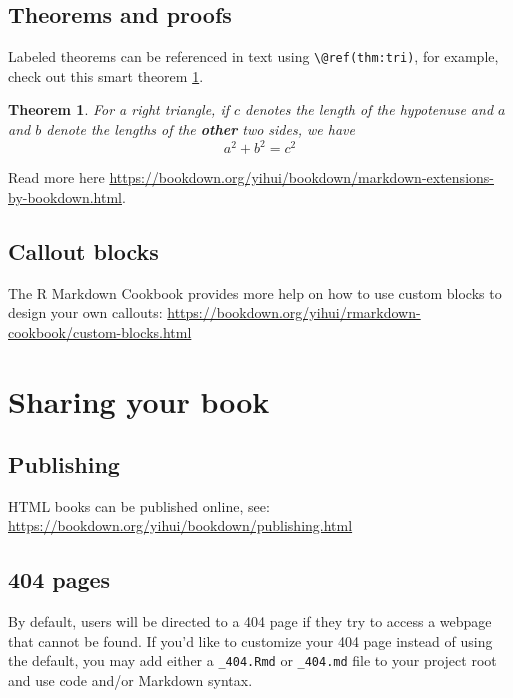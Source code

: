 \documentclass[
]{book}
\newtheorem{theorem}{Theorem}[chapter]
\theoremstyle{definition}
\theoremstyle{definition}
\theoremstyle{definition}
\theoremstyle{definition}
\theoremstyle{remark}
\begin{document}
\hypertarget{theorems-and-proofs}{%
\section{Theorems and proofs}\label{theorems-and-proofs}}

Labeled theorems can be referenced in text using \texttt{\textbackslash{}@ref(thm:tri)}, for example, check out this smart theorem \ref{thm:tri}.

\begin{theorem}
\protect\hypertarget{thm:tri}{}\label{thm:tri}For a right triangle, if \(c\) denotes the \emph{length} of the hypotenuse
and \(a\) and \(b\) denote the lengths of the \textbf{other} two sides, we have
\[a^2 + b^2 = c^2\]
\end{theorem}

Read more here \url{https://bookdown.org/yihui/bookdown/markdown-extensions-by-bookdown.html}.

\hypertarget{callout-blocks}{%
\section{Callout blocks}\label{callout-blocks}}

The R Markdown Cookbook provides more help on how to use custom blocks to design your own callouts: \url{https://bookdown.org/yihui/rmarkdown-cookbook/custom-blocks.html}

\hypertarget{sharing-your-book}{%
\chapter{Sharing your book}\label{sharing-your-book}}

\hypertarget{publishing}{%
\section{Publishing}\label{publishing}}

HTML books can be published online, see: \url{https://bookdown.org/yihui/bookdown/publishing.html}

\hypertarget{pages}{%
\section{404 pages}\label{pages}}

By default, users will be directed to a 404 page if they try to access a webpage that cannot be found. If you'd like to customize your 404 page instead of using the default, you may add either a \texttt{\_404.Rmd} or \texttt{\_404.md} file to your project root and use code and/or Markdown syntax.
\end{document}
